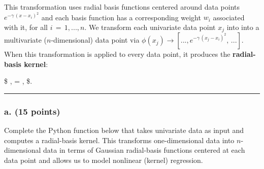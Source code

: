 \documentclass[11pt]{article}
\begin{document}
This transformation uses radial basis functions centered around data
points \(e^{-\gamma \, (x - x_i)^2}\) and each basis function has a
corresponding weight \(w_i\) associated with it, for all
\(i \, = \, 1, ..., n\). We transform each univariate data point \(x_j\)
into into a multivariate (\(n\)-dimensional) data point via
\(\phi(x_j) \rightarrow [..., e^{-\gamma \, (x_j - x_i)^2}, \, ...]\).
When this transformation is applied to every data point, it produces the
\textbf{radial-basis kernel}:

\$ \Phi , = , \$.

    \begin{center}\rule{0.5\linewidth}{0.5pt}\end{center}

\hypertarget{a.-15-points}{%
\subsubsection{\texorpdfstring{\textbf{a}. (15
points)}{a. (15 points)}}\label{a.-15-points}}

Complete the Python function below that takes univariate data as input
and computes a radial-basis kernel. This transforms one-dimensional data
into \(n\)-dimensional data in terms of Gaussian radial-basis functions
centered at each data point and allows us to model nonlinear (kernel)
regression.
\end{document}
